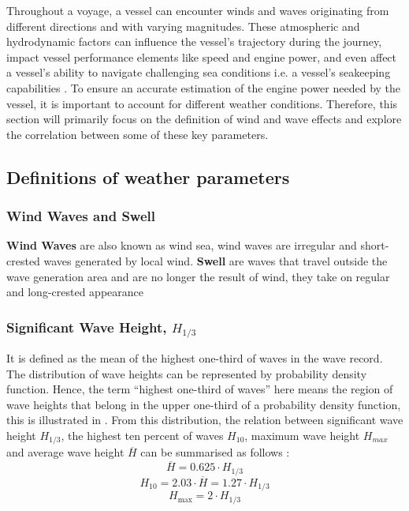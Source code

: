Throughout a voyage, a vessel can encounter winds and waves originating from different directions and with varying magnitudes. These atmospheric and hydrodynamic factors can influence the vessel's trajectory during the journey, impact vessel performance elements like speed and engine power, and even affect a vessel's ability to navigate challenging sea conditions i.e. a vessel's seakeeping capabilities . To ensure an accurate estimation of the engine power needed by the vessel, it is important to account for different weather conditions. Therefore, this section will primarily focus on the definition of wind and wave effects and explore the correlation between some of these key parameters.\\ 

\subsection{Definitions of weather parameters}\label{sec:weather_definition}

\subsubsection*{Wind Waves and Swell}

\textbf{Wind Waves} are also known as wind sea, wind waves are irregular and short-crested waves generated by local wind. \textbf{Swell} are waves that travel outside the wave generation area and are no longer the result of wind, they take on regular and long-crested appearance 

\subsubsection*{Significant Wave Height, $H_{1/3}$}

It is defined as the mean of the highest one-third of waves in the wave record. The distribution of wave heights can be represented by probability density function. Hence, the term ``highest one-third of waves'' here means the region of wave heights that belong in the upper one-third of a probability density function, this is illustrated in . From this distribution, the relation between significant wave height $H_{1/3}$, the highest ten percent of waves $H_{10}$, maximum wave height $H_{max}$ and average wave height $\overline{H}$ can be summarised as follows : 
\begin{equation}\label{eqn:Hsig_mean}
    \overline{H} = 0.625\cdot H_{1/3}
\end{equation}
\begin{equation}\label{eqn:Hsig_Hten}
    H_{10} = 2.03\cdot \overline{H} = 1.27\cdot H_{1/3} 
\end{equation}
\begin{equation}\label{eqn:Hsig_max}
    H_{\text{max}} = 2 \cdot H_{1/3} 
\end{equation} 

